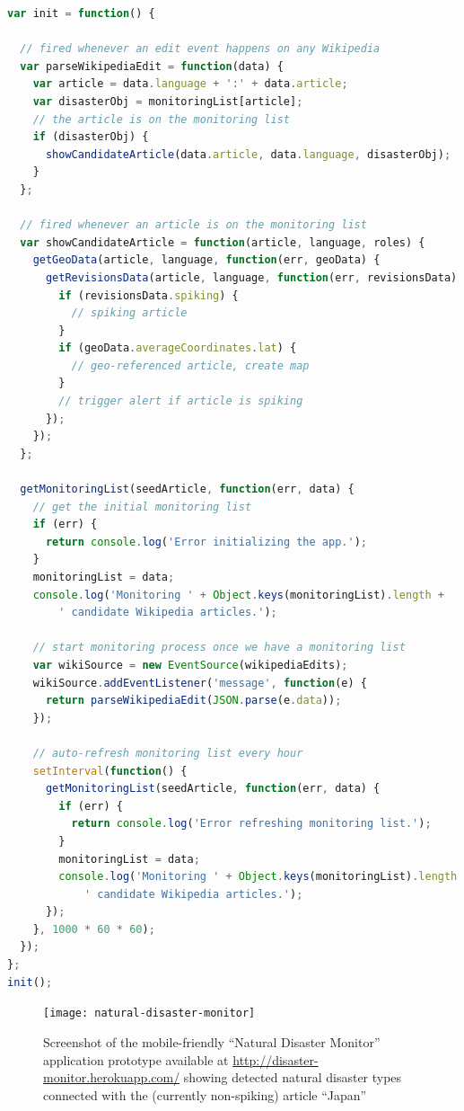 \documentclass[letterpaper]{article}
\begin{document}
\begin{lstlisting}[caption={Main monitoring loop of the natural disaster monitor},
  label=listing:monitoring, language=JavaScript,
  float=b!, stringstyle=\color{gray},morekeywords={for,if,console,log,addEventListener,JSON,parse,stringify,forEach}]
var init = function() {

  // fired whenever an edit event happens on any Wikipedia
  var parseWikipediaEdit = function(data) {
    var article = data.language + ':' + data.article;
    var disasterObj = monitoringList[article];
    // the article is on the monitoring list
    if (disasterObj) {    
      showCandidateArticle(data.article, data.language, disasterObj);
    }
  };
  
  // fired whenever an article is on the monitoring list
  var showCandidateArticle = function(article, language, roles) {
    getGeoData(article, language, function(err, geoData) {
      getRevisionsData(article, language, function(err, revisionsData) {
        if (revisionsData.spiking) {
          // spiking article
        }
        if (geoData.averageCoordinates.lat) {
          // geo-referenced article, create map
        }
        // trigger alert if article is spiking
      });
    });
  };  

  getMonitoringList(seedArticle, function(err, data) {
    // get the initial monitoring list
    if (err) {
      return console.log('Error initializing the app.');
    }
    monitoringList = data;
    console.log('Monitoring ' + Object.keys(monitoringList).length +
        ' candidate Wikipedia articles.');
    
    // start monitoring process once we have a monitoring list
    var wikiSource = new EventSource(wikipediaEdits);
    wikiSource.addEventListener('message', function(e) {
      return parseWikipediaEdit(JSON.parse(e.data));
    });
    
    // auto-refresh monitoring list every hour
    setInterval(function() {
      getMonitoringList(seedArticle, function(err, data) {
        if (err) {
          return console.log('Error refreshing monitoring list.');
        }
        monitoringList = data;
        console.log('Monitoring ' + Object.keys(monitoringList).length +
            ' candidate Wikipedia articles.');
      });
    }, 1000 * 60 * 60);
  });
};
init();
\end{lstlisting}

\begin{figure}[hbt]
  \centering
  \texttt{[image: natural-disaster-monitor]}
  \caption{Screenshot of the mobile-friendly ``Natural Disaster Monitor'' application
    prototype available at \url{http://disaster-monitor.herokuapp.com/}
    showing detected natural disaster types connected with the (currently non-spiking) article ``Japan''}
  \label{fig:screenshot}
\end{figure}
 
\end{document}
